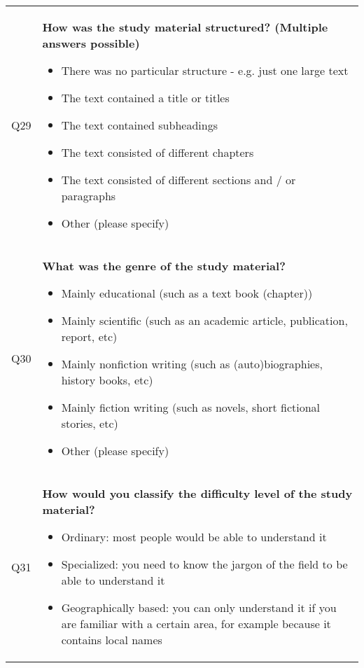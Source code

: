 \begin{xtabular}{@{\,}l <{\hskip 2pt} >{\raggedright\arraybackslash}p{0.82\textwidth}}
        Q29 & \textbf{How was the study material structured? (Multiple answers possible)}
        \begin{itemize}[label=$\square$, leftmargin=*, nosep]
          \item There was no particular structure - e.g. just one large text
          \item The text contained a title or titles
          \item The text contained subheadings
          \item The text consisted of different chapters
          \item The text consisted of different sections and / or paragraphs
          \item Other (please specify)
        \end{itemize}

        \\

        Q30 & \textbf{What was the genre of the study material?}
        \begin{itemize}[label=$\square$, leftmargin=*, nosep]
          \item Mainly educational (such as a text book (chapter))
          \item Mainly scientific (such as an academic article, publication, report, etc)
          \item Mainly nonfiction writing (such as (auto)biographies, history books, etc)
          \item Mainly fiction writing (such as novels, short fictional stories, etc)
          \item Other (please specify)
        \end{itemize}

        \\

        Q31 & \textbf{How would you classify the difficulty level of the study material?}
        \begin{itemize}[label=$\square$, leftmargin=*, nosep]
          \item Ordinary: most people would be able to understand it
          \item Specialized: you need to know the jargon of the field to be able to understand it
          \item Geographically based: you can only understand it if you are familiar with a certain area, for example because it contains local names
        \end{itemize}


\end{xtabular}
